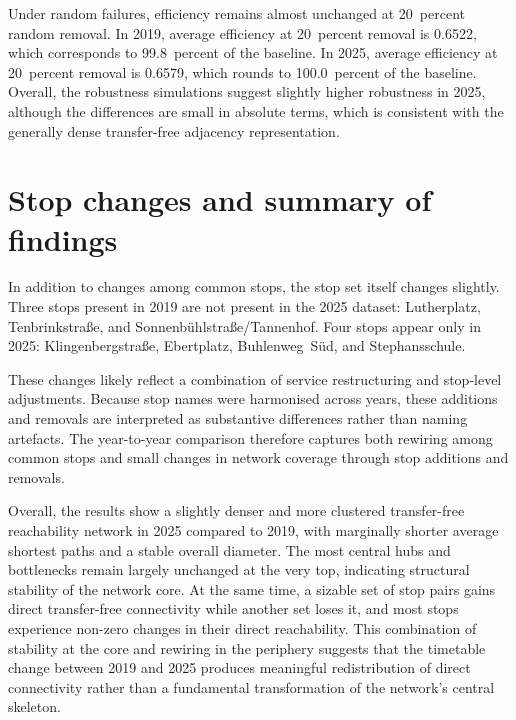 \documentclass[12pt,a4paper,oneside]{report}
\begin{document}
Under random failures, efficiency remains almost unchanged at 20~percent random removal.
In 2019, average efficiency at 20~percent removal is 0.6522, which corresponds to 99.8~percent of the baseline.
In 2025, average efficiency at 20~percent removal is 0.6579, which rounds to 100.0~percent of the baseline.
Overall, the robustness simulations suggest slightly higher robustness in 2025, although the differences are small in absolute terms, which is consistent with the generally dense transfer-free adjacency representation.

\section{Stop changes and summary of findings}\label{sec:stop-changes}

In addition to changes among common stops, the stop set itself changes slightly.
Three stops present in 2019 are not present in the 2025 dataset: Lutherplatz, Tenbrinkstra\ss{}e, and Sonnenb\"{u}hlstra\ss{}e/Tannenhof.
Four stops appear only in 2025: Klingenbergstra\ss{}e, Ebertplatz, Buhlenweg~S\"{u}d, and Stephansschule.

These changes likely reflect a combination of service restructuring and stop-level adjustments.
Because stop names were harmonised across years, these additions and removals are interpreted as substantive differences rather than naming artefacts.
The year-to-year comparison therefore captures both rewiring among common stops and small changes in network coverage through stop additions and removals.

Overall, the results show a slightly denser and more clustered transfer-free reachability network in 2025 compared to 2019, with marginally shorter average shortest paths and a stable overall diameter.
The most central hubs and bottlenecks remain largely unchanged at the very top, indicating structural stability of the network core.
At the same time, a sizable set of stop pairs gains direct transfer-free connectivity while another set loses it, and most stops experience non-zero changes in their direct reachability.
This combination of stability at the core and rewiring in the periphery suggests that the timetable change between 2019 and 2025 produces meaningful redistribution of direct connectivity rather than a fundamental transformation of the network's central skeleton.

\end{document}
